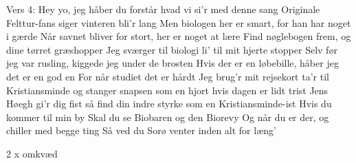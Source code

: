 \documentclass[a4paper,11pt]{article}
\begin{document}
\begin{song}
Vers 4:
Hey yo, jeg håber du forstår hvad vi si'r med denne sang
Originale Felttur-fans siger vinteren bli'r lang
Men biologen her er smart, for han har noget i gærde
Når savnet bliver for stort, her er noget at lære
Find nøglebogen frem, og dine tørret græshopper
Jeg sværger til biologi li' til mit hjerte stopper
Selv før jeg var rusling, kiggede jeg under de brosten
Hvis der er en løbebille, håber jeg det er en god en
For når studiet det er hårdt
Jeg brug'r mit rejsekort
ta'r til Kristiansminde og stanger snapsen som en hjort
hvis dagen er lidt trist
Jens Høegh gi'r dig fist
så find din indre styrke som en Kristiansminde-ist
Hvis du kommer til min by
Skal du se Biobaren og den Biorevy
Og når du er der, og chiller med begge ting
Så ved du Sorø venter inden alt for læng'

2 x omkvæd
\end{song}
\end{document}

